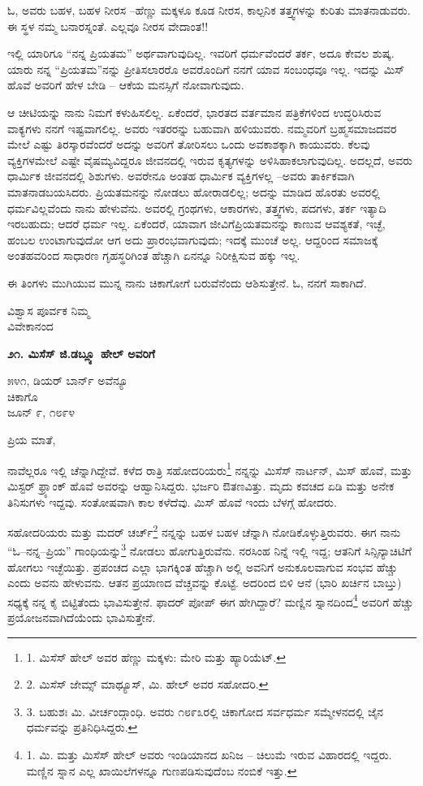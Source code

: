 ಓ, ಅವರು ಬಹಳ, ಬಹಳ ನೀರಸ –ಹೆಣ್ಣು ಮಕ್ಕಳೂ ಕೂಡ ನೀರಸ, ಕಾಲ್ಪನಿಕ ತತ್ತ್ವಗಳನ್ನು ಕುರಿತು ಮಾತನಾಡುವರು. ಈ ಸ್ಥಳ ನಮ್ಮ ಬನಾರಸ್ನಂತೆ. ಎಲ್ಲವೂ ನೀರಸ ವೇದಾಂತ!!

ಇಲ್ಲಿ ಯಾರಿಗೂ “ನನ್ನ ಪ್ರಿಯತಮ” ಅರ್ಥವಾಗುವುದಿಲ್ಲ. ಇವರಿಗೆ ಧರ್ಮವೆಂದರೆ ತರ್ಕ, ಅದೂ ಕೇವಲ ಶುಷ್ಕ. ಯಾರು ನನ್ನ “ಪ್ರಿಯತಮ”ನನ್ನು ಪ್ರೀತಿಸಲಾರರೊ ಅವರೊಂದಿಗೆ ನನಗೆ ಯಾವ ಸಂಬಂಧವೂ ಇಲ್ಲ. ಇದನ್ನು ಮಿಸ್ ಹೊವೆ ಅವರಿಗೆ ಹೇಳ ಬೇಡಿ – ಆಕೆಯ ಮನಸ್ಸಿಗೆ ನೋವಾಗುವುದು.

ಆ ಚೀಟಿಯನ್ನು ನಾನು ನಿಮಗೆ ಕಳುಹಿಸಲಿಲ್ಲ. ಏಕೆಂದರೆ, ಭಾರತದ ವರ್ತಮಾನ ಪತ್ರಿಕೆಗಳಿಂದ ಉದ್ಧರಿಸಿರುವ ವಾಕ್ಯಗಳು ನನಗೆ ಇಷ್ಟವಾಗಲಿಲ್ಲ. ಅವರು ಇತರರನ್ನು ಬಹುವಾಗಿ ಹಳಿಯುವರು. ನಮ್ಮವರಿಗೆ ಬ್ರಹ್ಮಸಮಾಜದವರ ಮೇಲೆ ಎಷ್ಟು ತಿರಸ್ಕಾರವೆಂದರೆ ಅದನ್ನು ಅವರಿಗೆ ತೋರಿಸಲು ಒಂದು ಅವಕಾಶಕ್ಕಾಗಿ ಕಾಯುವರು. ಕೆಲವು ವ್ಯಕ್ತಿಗಳಮೇಲೆ ಎಷ್ಟೇ ವೈಷಮ್ಯವಿದ್ದರೂ ಜೀವನದಲ್ಲಿ ಇರುವ ಕೃತ್ಯಗಳನ್ನು ಅಳಿಸಿಹಾಕಲಾಗುವುದಿಲ್ಲ. ಅದಲ್ಲದೆ, ಅವರು ಧಾರ್ಮಿಕ ಜೀವನದಲ್ಲಿ ಶಿಶುಗಳು. ಅವರೇನೂ ಅಂತಹ ಧಾರ್ಮಿಕ ವ್ಯಕ್ತಿಗಳಲ್ಲ –ಅವರು ತಾರ್ಕಿಕವಾಗಿ ಮಾತನಾಡಬಯಸಿದರು. ಪ್ರಿಯತಮನನ್ನು ನೋಡಲು ಹೋರಾಡಲಿಲ್ಲ; ಅದನ್ನು ಮಾಡಿದ ಹೊರತು ಅವರಲ್ಲಿ ಧರ್ಮವಿಲ್ಲವೆಂದು ನಾನು ಹೇಳುವೆನು. ಅವರಲ್ಲಿ ಗ್ರಂಥಗಳು, ಆಕಾರಗಳು, ತತ್ತ್ವಗಳು, ಪದಗಳು, ತರ್ಕ ಇತ್ಯಾದಿ ಇರಬಹುದು; ಆದರೆ ಧರ್ಮ ಇಲ್ಲ. ಏಕೆಂದರೆ, ಯಾವಾಗ ಜೀವಿಗೆಪ್ರಿಯತಮನನ್ನು ಕಾಣುವ ಆವಶ್ಯಕತೆ, ಇಚ್ಛೆ, ಹಂಬಲ ಉಂಟಾಗುವುದೋ ಆಗ ಅದು ಪ್ರಾರಂಭವಾಗುವುದು; ಇದಕ್ಕೆ ಮುಂಚೆ ಅಲ್ಲ. ಆದ್ದರಿಂದ ಸಮಾಜಕ್ಕೆ ಅಂತಹವರಿಂದ ಸಾಧಾರಣ ಗೃಹಸ್ಥರಿಗಿಂತ ಹೆಚ್ಚಾಗಿ ಏನನ್ನೂ ನಿರೀಕ್ಷಿಸುವ ಹಕ್ಕು ಇಲ್ಲ.

ಈ ತಿಂಗಳು ಮುಗಿಯುವ ಮುನ್ನ ನಾನು ಚಿಕಾಗೋಗೆ ಬರುವೆನೆಂದು ಆಶಿಸುತ್ತೇನೆ. ಓ, ನನಗೆ ಸಾಕಾಗಿದೆ.

\begin{flushright}
ವಿಶ್ವಾಸ ಪೂರ್ವಕ ನಿಮ್ಮ\\ವಿವೇಕಾನಂದ
\end{flushright}

\begin{center}
\textbf{೨೧. ಮಿಸೆಸ್ ಜಿ.ಡಬ್ಲ್ಯೂ ಹೇಲ್ ಅವರಿಗೆ}
\end{center}

\begin{flushright}
೫೪೧, ಡಿಯರ್ ಬಾರ್ನ್ ಅವೆನ್ಯೂ\\ಚಿಕಾಗೊ\\ಜೂನ್ ೯, ೧೮೯೪
\end{flushright}

ಪ್ರಿಯ ಮಾತೆ,

ನಾವೆಲ್ಲರೂ ಇಲ್ಲಿ ಚೆನ್ನಾಗಿದ್ದೇವೆ. ಕಳೆದ ರಾತ್ರಿ ಸಹೋದರಿಯರು\footnote{1. ಮಿಸೆಸ್ ಹೇಲ್ ಅವರ ಹೆಣ್ಣು ಮಕ್ಕಳು: ಮೇರಿ ಮತ್ತು ಹ್ಯಾರಿಯೆಟ್.} ನನ್ನನ್ನು ಮಿಸೆಸ್ ನಾರ್ಟನ್, ಮಿಸ್ ಹೊವೆ, ಮತ್ತು ಮಿಸ್ಟರ್ ಫ್ರ್ಯಾಂಕ್ ಹೊವೆ ಅವರನ್ನು ಆಹ್ವಾನಿಸಿದ್ದರು. ಭರ್ಜರಿ ಔತಣವಿತ್ತು. ಮೃದು ಕವಚದ ಏಡಿ ಮತ್ತು ಅನೇಕ ತಿನಿಸುಗಳು ಇದ್ದವು. ಸಂತೋಷವಾಗಿ ಕಾಲ ಕಳೆದೆವು. ಮಿಸ್ ಹೊವೆ ಇಂದು ಬೆಳಗ್ಗೆ ಹೋದರು.

ಸಹೋದರಿಯರು ಮತ್ತು ಮದರ್ ಚರ್ಚ್\footnote{2. ಮಿಸೆಸ್ ಜೇಮ್ಸ್ ಮಾಥ್ಯೂಸ್, ಮಿ. ಹೇಲ್ ಅವರ ಸಹೋದರಿ.} ನನ್ನನ್ನು ಬಹಳ ಬಹಳ ಚೆನ್ನಾಗಿ ನೋಡಿಕೊಳ್ಳುತ್ತಿರುವರು. ಈಗ ನಾನು “ಓ–ನನ್ನ–ಪ್ರಿಯ” ಗಾಂಧಿಯನ್ನು\footnote{3. ಬಹುಶಃ ಮಿ. ವೀರ್ಚಂದ್ಗಾಂಧಿ. ಅವರು ೧೮೯೩ರಲ್ಲಿ ಚಿಕಾಗೋದ ಸರ್ವಧರ್ಮ ಸಮ್ಮೇಳನದಲ್ಲಿ ಜೈನ ಧರ್ಮವನ್ನು ಪ್ರತಿನಿಧಿಸಿದ್ದರು.} ನೋಡಲು ಹೋಗುತ್ತಿರುವೆನು. ನರಸಿಂಹ ನಿನ್ನೆ ಇಲ್ಲಿ ಇದ್ದ; ಆತನಿಗೆ ಸಿನ್ಸಿನ್ಯಾಚಿಟಿಗೆ ಹೋಗಲು ಇಚ್ಛೆಯಿತ್ತು. ಪ್ರಪಂಚದ ಎಲ್ಲಾ ಭಾಗಕ್ಕಿಂತ ಹೆಚ್ಚಾಗಿ ಅಲ್ಲಿ ಅವನಿಗೆ ಅನುಕೂಲವಾಗುವ ಸಂಭವ ಹೆಚ್ಚು ಎಂದು ಅವನು ಹೇಳುವನು. ಆತನ ಪ್ರಯಾಣದ ವೆಚ್ಚವನ್ನು ಕೊಟ್ಟೆ. ಅದರಿಂದ ಬಿಳಿ ಆನೆ (ಭಾರಿ ಖರ್ಚಿನ ಬಾಬ್ತು) ಸಧ್ಯಕ್ಕೆ ನನ್ನ ಕೈ ಬಿಟ್ಟಿತೆಂದು ಭಾವಿಸುತ್ತೇನೆ. ಫಾದರ್ ಪೋಪ್ ಈಗ ಹೇಗಿದ್ದಾರೆ? ಮಣ್ಣಿನ ಸ್ನಾನದಿಂದ\footnote{1. ಮಿ. ಮತ್ತು ಮಿಸೆಸ್ ಹೇಲ್ ಅವರು ಇಂಡಿಯಾನದ ಖನಿಜ – ಚಿಲುಮೆ ಇರುವ ವಿಹಾರದಲ್ಲಿ ಇದ್ದರು. ಮಣ್ಣಿನ ಸ್ನಾನ ಎಲ್ಲ ಖಾಯಿಲೆಗಳನ್ನೂ ಗುಣಪಡಿಸುವುದೆಂಬ ನಂಬಿಕೆ ಇತ್ತು.} ಅವರಿಗೆ ಹೆಚ್ಚು ಪ್ರಯೋಜನವಾಗಿದೆಯೆಂದು ಭಾವಿಸುತ್ತೇನೆ.


